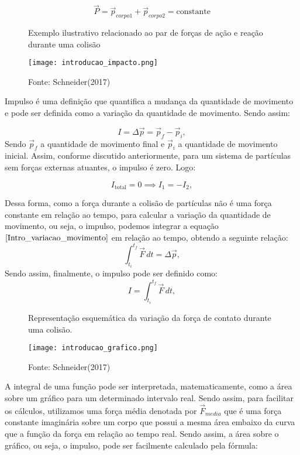 \documentclass[12pt, twoside]{article}
\begin{document}
\begin{equation}
\vec{P} = \vec{p}_{corpo 1} + \vec{p}_{corpo 2} = \text{constante}
\end{equation}

\begin{figure}[h!]
\centering
\caption{Exemplo ilustrativo relacionado ao par de forças de ação e reação durante uma colisão}
\texttt{[image: introducao\_impacto.png]}
\caption*{Fonte: Schneider(2017)}
\label{fig:exemplo1}
\end{figure}

Impulso é uma definição que quantifica a mudança da quantidade de movimento e pode ser definida como a variação da quantidade de movimento. Sendo assim:

\begin{equation}
\label{eq:Impulso_variacao_quantidade_movimento}
I = \Delta \vec{p} = \vec{p}_{f} - \vec{p}_{i},
\end{equation}
Sendo $\vec{p}_{f}$ a quantidade de movimento final e $\vec{p}_{i}$ a quantidade de movimento inicial. Assim, conforme discutido anteriormente, para um sistema de partículas sem forças externas atuantes, o impulso é zero. Logo:

\begin{equation}
I_{\text{total}} = 0 \implies I_1 = -I_2,
\end{equation}

Dessa forma, como a força durante a colisão de partículas não é uma força constante em relação ao tempo, para calcular a variação da quantidade de movimento, ou seja, o impulso, podemos integrar a equação $\ref{Intro_variacao_movimento}$ em relação ao tempo, obtendo a seguinte relação:
\begin{equation}
\int_{t_i}^{t_f} \vec{F}\, dt = \Delta \vec{p},
\end{equation}
Sendo assim, finalmente, o impulso pode ser definido como:
\begin{equation}
I = \int_{t_i}^{t_f} \vec{F}\, dt,
\end{equation}

\begin{figure}[h!]
\centering
\caption{Representação esquemática da variação da força de contato durante uma colisão.}
\texttt{[image: introducao\_grafico.png]}
\caption*{Fonte: Schneider(2017)}
\label{fig:colisao}
\end{figure}

A integral de uma função pode ser interpretada, matematicamente, como a área sobre um gráfico para um determinado intervalo real. Sendo assim, para facilitar os cálculos, utilizamos uma força média denotada por $\vec{F}_{media}$ que é uma força constante imaginária sobre um corpo que possui a mesma área embaixo da curva que a função da força em relação ao tempo real. Sendo assim, a área sobre o gráfico, ou seja, o impulso, pode ser facilmente calculado pela fórmula:
\end{document}
